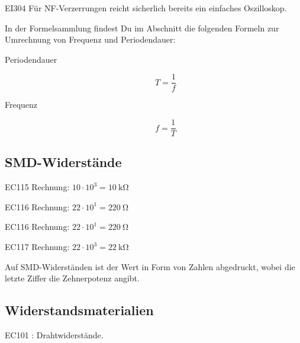  \begin{sol}{EI304}    
    Für NF-Verzerrungen reicht sicherlich bereits ein einfaches Oszilloskop.
 \end{sol}

\begin{ohmchapter}
    In der Formelsammlung findest Du im Abschnitt  die folgenden Formeln zur Umrechnung von Frequenz und Periodendauer:

    \begin{description}
    \item[Periodendauer] $$ T=\frac{1}{f} $$
    \item[Frequenz] $$ f = \frac{1}{T} $$
    \end{description}
\end{ohmchapter}   

\subsection{SMD-Widerstände}

 \begin{sol}{EC115}    
    Rechnung: $ 10 \cdot 10^3 = \SI{10}{\kilo\ohm}$
 \end{sol}

  \begin{sol}{EC116}    
    Rechnung: $ 22 \cdot 10^1 = \SI{220}{\ohm}$
 \end{sol}

  \begin{sol}{EC116}    
    Rechnung: $ 22 \cdot 10^1 = \SI{220}{\ohm}$
 \end{sol}

  \begin{sol}{EC117}    
    Rechnung: $ 22 \cdot 10^3 = \SI{22}{\kilo\ohm}$
 \end{sol}

\begin{ohmchapter}
Auf SMD-Widerständen ist der Wert in Form von Zahlen abgedruckt, wobei die letzte Ziffer die Zehnerpotenz angibt.
\end{ohmchapter}   

\subsection{Widerstandsmaterialien}

  \begin{sol}{EC101}    
    : Drahtwiderstände.
  \end{sol}

